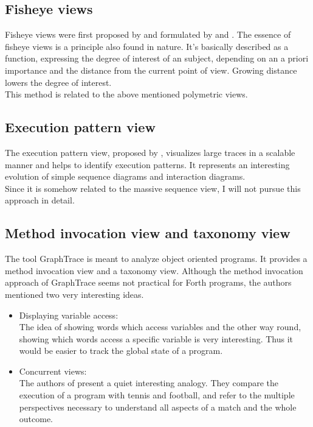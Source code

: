 \subsection*{Fisheye views}
Fisheye views were first proposed by \cite{Furnas:1986:GFV:22627.22342} and formulated by \cite{Storey:1995:GLA:647547.728600} and \cite{Sarkar:1994:GFV:198366.198384}. The essence of fisheye views is a principle also found in nature. It's basically described as a function, expressing the degree of interest of an subject, depending on an a priori importance and the distance from the current point of view. Growing distance lowers the degree of interest.
\\
This method is related to the above mentioned polymetric views.

\subsection*{Execution pattern view}
The execution pattern view, proposed by \cite{Pauw98executionpatterns}, visualizes large traces in a scalable manner and helps to identify execution patterns. It represents an interesting evolution of simple sequence diagrams and interaction diagrams.
\\
Since it is somehow related to the massive sequence view, I will not pursue this approach in detail.

\subsection*{Method invocation view and taxonomy view}
The tool \gls{GraphTrace}\cite{Kleyn:1988:GOS:62084.62101} is meant to analyze object oriented programs. It provides a method invocation view and a taxonomy view. Although the method invocation approach of GraphTrace seems not practical for Forth programs, the authors mentioned two very interesting ideas.
\begin{itemize}
\item Displaying variable access:\\
	The idea of showing words which access variables and the other way round, showing which words access a specific variable is very interesting. Thus it would be easier to track the global state of a program.
\item Concurrent views:\\
	The authors of \cite{Kleyn:1988:GOS:62084.62101} present a quiet interesting analogy. They compare the execution of a program with tennis and football, and refer to the multiple perspectives necessary to understand all aspects of a match and the whole outcome.
\end{itemize}

